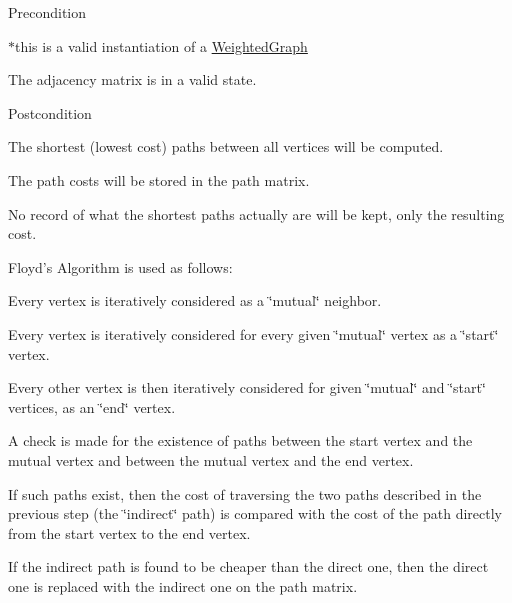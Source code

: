 \begin{DoxyPrecond}{\-Precondition}

\begin{DoxyEnumerate}
\item $\ast$this is a valid instantiation of a \hyperlink{class_weighted_graph}{\-Weighted\-Graph}
\item \-The adjacency matrix is in a valid state.
\end{DoxyEnumerate}
\end{DoxyPrecond}
\begin{DoxyPostcond}{\-Postcondition}

\begin{DoxyEnumerate}
\item \-The shortest (lowest cost) paths between all vertices will be computed.
\item \-The path costs will be stored in the path matrix.
\item \-No record of what the shortest paths actually are will be kept, only the resulting cost.
\end{DoxyEnumerate}
\end{DoxyPostcond}
\-Floyd's \-Algorithm is used as follows\-:
\begin{DoxyEnumerate}
\item \-Every vertex is iteratively considered as a \char`\"{}mutual\char`\"{} neighbor.
\item \-Every vertex is iteratively considered for every given \char`\"{}mutual\char`\"{} vertex as a \char`\"{}start\char`\"{} vertex.
\item \-Every other vertex is then iteratively considered for given \char`\"{}mutual\char`\"{} and \char`\"{}start\char`\"{} vertices, as an \char`\"{}end\char`\"{} vertex.
\item \-A check is made for the existence of paths between the start vertex and the mutual vertex and between the mutual vertex and the end vertex.
\item \-If such paths exist, then the cost of traversing the two paths described in the previous step (the \char`\"{}indirect\char`\"{} path) is compared with the cost of the path directly from the start vertex to the end vertex.
\item \-If the indirect path is found to be cheaper than the direct one, then the direct one is replaced with the indirect one on the path matrix.
\end{DoxyEnumerate}



